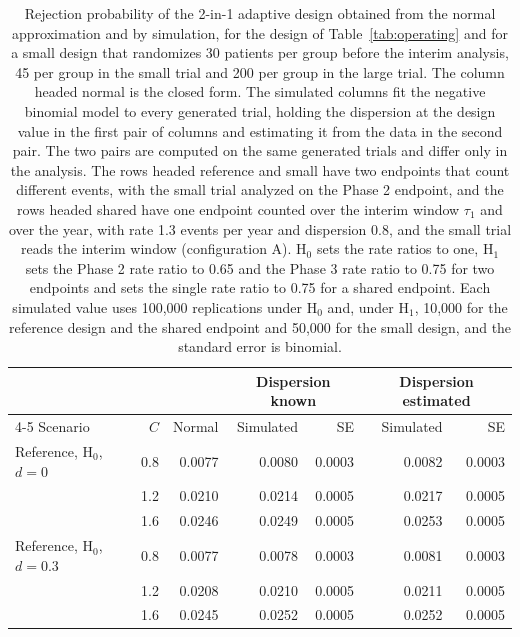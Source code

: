 \begin{table}[htbp]
\centering
\caption{Rejection probability of the 2-in-1 adaptive design obtained from the normal approximation and by simulation, for the design of Table~\ref{tab:operating} and for a small design that randomizes 30 patients per group before the interim analysis, 45 per group in the small trial and 200 per group in the large trial. The column headed normal is the closed form. The simulated columns fit the negative binomial model to every generated trial, holding the dispersion at the design value in the first pair of columns and estimating it from the data in the second pair. The two pairs are computed on the same generated trials and differ only in the analysis. The rows headed reference and small have two endpoints that count different events, with the small trial analyzed on the Phase 2 endpoint, and the rows headed shared have one endpoint counted over the interim window $\tau_1$ and over the year, with rate 1.3 events per year and dispersion 0.8, and the small trial reads the interim window (configuration A). $\mathrm{H}_0$ sets the rate ratios to one, $\mathrm{H}_1$ sets the Phase 2 rate ratio to 0.65 and the Phase 3 rate ratio to 0.75 for two endpoints and sets the single rate ratio to 0.75 for a shared endpoint. Each simulated value uses 100,000 replications under $\mathrm{H}_0$ and, under $\mathrm{H}_1$, 10,000 for the reference design and the shared endpoint and 50,000 for the small design, and the standard error is binomial.}
\label{tab:validation}
\vspace{0.6em}
\footnotesize
\renewcommand{\arraystretch}{0.85}
\setlength{\tabcolsep}{3pt}
\begin{tabular}{lrrrrrr}
\hline
 &  &  & \multicolumn{2}{c}{Dispersion known} & \multicolumn{2}{c}{Dispersion estimated} \\
\cline{4-5}\cline{6-7}
Scenario & $C$ & Normal & Simulated & SE & Simulated & SE \\
\hline
Reference, $\mathrm{H}_0$, $d = 0$ & 0.8 & 0.0077 & 0.0080 & 0.0003 & 0.0082 & 0.0003 \\
 & 1.2 & 0.0210 & 0.0214 & 0.0005 & 0.0217 & 0.0005 \\
 & 1.6 & 0.0246 & 0.0249 & 0.0005 & 0.0253 & 0.0005 \\
Reference, $\mathrm{H}_0$, $d = 0.3$ & 0.8 & 0.0077 & 0.0078 & 0.0003 & 0.0081 & 0.0003 \\
 & 1.2 & 0.0208 & 0.0210 & 0.0005 & 0.0211 & 0.0005 \\
 & 1.6 & 0.0245 & 0.0252 & 0.0005 & 0.0252 & 0.0005 \\

\end{tabular}
\end{table}
